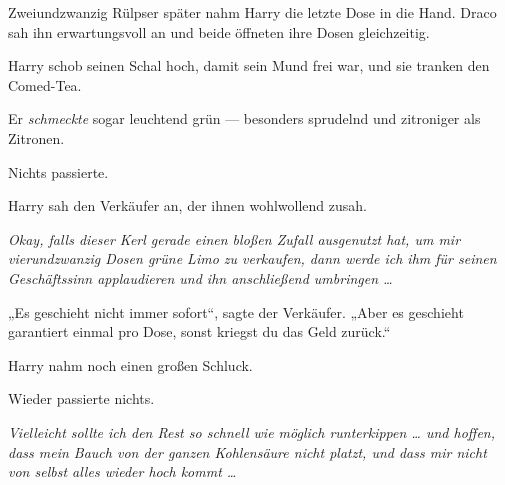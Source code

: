 Zweiundzwanzig Rülpser später nahm Harry die letzte Dose in die Hand. Draco sah ihn erwartungsvoll an und beide öffneten ihre Dosen gleichzeitig.

Harry schob seinen Schal hoch, damit sein Mund frei war, und sie tranken den Comed-Tea.

Er \emph{schmeckte} sogar leuchtend grün — besonders sprudelnd und zitroniger als Zitronen.

Nichts passierte.

Harry sah den Verkäufer an, der ihnen wohlwollend zusah.

\emph{Okay, falls dieser Kerl gerade einen bloßen Zufall ausgenutzt hat, um mir vierundzwanzig Dosen grüne Limo zu verkaufen, dann werde ich ihm für seinen Geschäftssinn applaudieren und ihn anschließend umbringen …}

„Es geschieht nicht immer sofort“, sagte der Verkäufer.
„Aber es geschieht garantiert einmal pro Dose, sonst kriegst du das Geld zurück.“

Harry nahm noch einen großen Schluck.

Wieder passierte nichts.

\emph{Vielleicht sollte ich den Rest so schnell wie möglich runterkippen … und hoffen, dass mein Bauch von der ganzen Kohlensäure nicht platzt, und dass mir nicht von selbst alles wieder hoch kommt …}


